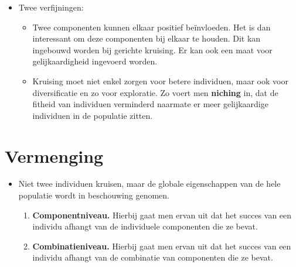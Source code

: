 \begin{itemize}
    \item Twee verfijningen:
    \begin{itemize}
        \item Twee componenten kunnen elkaar positief beïnvloeden. Het is dan interessant om deze componenten bij elkaar te houden. Dit kan ingebouwd worden bij gerichte kruising. Er kan ook een maat voor gelijkaardigheid ingevoerd worden.
        \item Kruising moet niet enkel zorgen voor betere individuen, maar ook voor diversificatie en zo voor exploratie. Zo voert men \textbf{niching} in, dat de fitheid van individuen verminderd naarmate er meer gelijkaardige individuen in de populatie zitten.
    \end{itemize}

\end{itemize}


\section{Vermenging}
\begin{itemize}
    \item Niet twee individuen kruisen, maar de globale eigenschappen van de hele populatie wordt in beschouwing genomen.
    \begin{enumerate}
        \item \textbf{Componentniveau.} Hierbij gaat men ervan uit dat het succes van een individu afhangt van de individuele componenten die ze bevat.
        \item \textbf{Combinatieniveau.} Hierbij gaat men ervan uit dat het succes van een individu afhangt van de combinatie van componenten die ze bevat.
    \end{enumerate}
\end{itemize}

